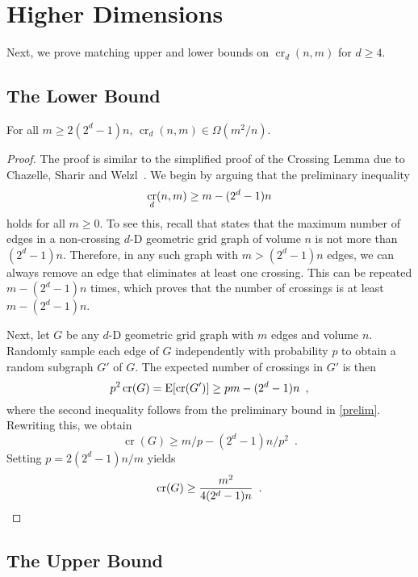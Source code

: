 \documentclass{patmorin}
\DeclareMathOperator{\crs}{cr}
\begin{document}
\section{Higher Dimensions}

Next, we prove matching upper and lower bounds on $\crs_d(n,m)$ for
$d\ge 4$.

\subsection{The Lower Bound}

\begin{thm}
  For all $m\ge 2(2^d-1)n$, $\crs_d(n,m)\in\Omega(m^2/n)$.
\end{thm}

\begin{proof}
  The proof is similar to the simplified proof of the Crossing
  Lemma due to Chazelle, Sharir and Welzl~\cite[Chapter~30, Theorem
  4]{aigner.ziegler:proofs}.  We begin by arguing that the preliminary
  inequality
  \begin{equation}
    \crs_d(n,m) \ge m - (2^d-1)n  \eqlabel{prelim}
  \end{equation}
  holds for all $m \ge 0$.  To see this, recall that  states
  that the maximum number of edges in a non-crossing $d$-D geometric
  grid graph of volume $n$ is not more than $(2^d-1)n$.  Therefore,
  in any such graph with $m> (2^d-1)n$ edges, we can always remove an
  edge that eliminates at least one crossing.  This can be repeated
  $m-(2^d-1)n$ times, which proves that the number of crossings is at
  least $m-(2^d-1)n$.

  Next, let $G$ be any $d$-D geometric grid graph with $m$ edges and
  volume $n$.  Randomly sample each edge of $G$ independently with
  probability $p$ to obtain a random subgraph $G'$ of $G$.  The expected
  number of crossings in $G'$ is then
  \[  
     p^2\crs(G) = \E[\crs(G')] \ge pm - (2^d-1)n \enspace ,
  \] 
  where the second inequality follows from the preliminary bound
  in \eqref{prelim}.  Rewriting this, we obtain
  \[  
     \crs(G) \ge m/p - (2^d-1)n/p^2 \enspace . 
  \]
  Setting $p=2(2^{d}-1)n/m$ yields
  \[  
     \crs(G) \ge \frac{m^2}{4(2^{d}-1)n} \enspace .  \qedhere 
  \]
\end{proof}

\subsection{The Upper Bound}
\end{document}

